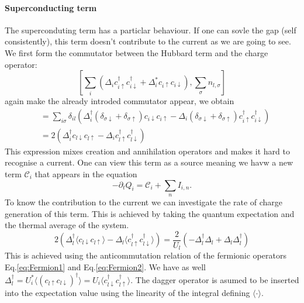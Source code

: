 \documentclass[../main.tex]{subfile}
\begin{document}
\paragraph{Superconducting term} The superconduting term has a particlar behaviour. If one can sovle the gap (self consistently), this term 
doesn't contribute to the current as we are going to see. We first form the commutator between the Hubbard term and the charge operator:
\begin{equation*}
        \left[\sum_i\left(\Delta_i c_{i\uparrow}^{\dagger}c_{i\downarrow}^{\dagger} + 
        \Delta_i^{\ast} c_{i\uparrow}c_{i\downarrow}\right) , \sum_{\sigma} n_{l,\sigma}\right]
\end{equation*}
again make the already introded commutator appear, we obtain
\begin{equation*}
    \begin{aligned}
    &= \sum_{i\sigma} \delta_{il}\left(\Delta_i^{\dagger} (\delta_{\sigma\downarrow} + \delta_{\sigma\uparrow})c_{i\downarrow}c_{i\uparrow} 
    -\Delta_i(\delta_{\sigma\downarrow} + \delta_{\sigma\uparrow})c_{i\uparrow}^{\dagger} c_{i\downarrow}^{\dagger}\right)\\
    &= 2 \left( \Delta_i^{\dagger} c_{l\downarrow}c_{l\uparrow} - \Delta_i c_{l\uparrow}^{\dagger}c_{l\downarrow}^{\dagger}\right)
    \end{aligned}
\end{equation*}
This expression mixes creation and annihilation operators and makes it hard to recognise a current. One can view this term as a 
source meaning we havw a new term $\mathcal{C}_i$ that appears in the equation  
\[
    -\partial_t Q_i = \mathcal{C}_i +  \sum_n I_{i,n}  .
\]
To know the contribution to the current we can investigate the rate of charge generation of this term. This is achieved by taking the quantum
expectation and the thermal average of the system.
\[
    2 \left( \Delta_l^{\dagger}\langle c_{l\downarrow}c_{l\uparrow}\rangle - \Delta_l \langle c_{l\uparrow}^{\dagger}c_{l\downarrow}^{\dagger}\rangle\right)
    = \frac{2}{U_l}\left(-\Delta_l^{\dagger}\Delta_l + \Delta_l \Delta_l^{\dagger}\right)
\]
This is achieved using the anticommutation relation of the fermionic operators Eq.\ref{eq:Fermion1} and Eq.\ref{eq:Fermion2}. 
We have as well $\Delta_l^{\dagger} = U_i^{\ast} \langle(c_{l\uparrow}c_{l\downarrow})^{\dagger}\rangle = U_i \langle c_{l\downarrow}^{\dagger} c_{l\uparrow}^{\dagger}\rangle$.
The dagger operator is asumed to be inserted into the expectation value using the linearity of the integral defining $\langle \cdot\rangle$.
\end{document}
